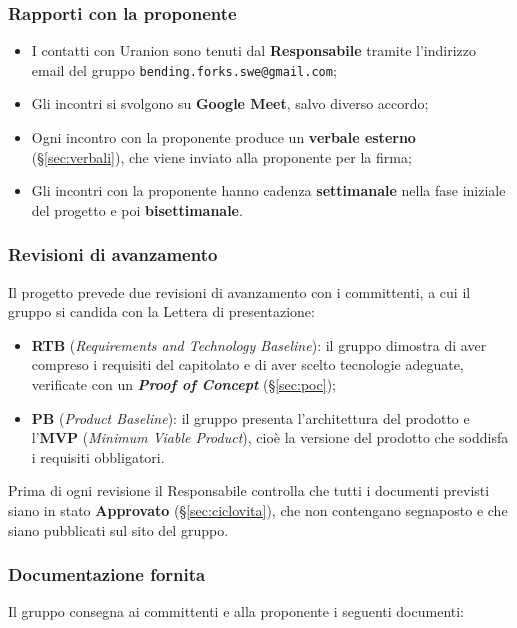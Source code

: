 \documentclass[12pt,a4paper]{article}
\newcommand{\tightlist}{\setlength{\itemsep}{1pt}\setlength{\parskip}{0pt}}
\begin{document}
\subsubsection{Rapporti con la proponente}
\begin{itemize}
\tightlist
\item I contatti con Uranion sono tenuti dal \textbf{Responsabile} tramite l'indirizzo email del gruppo \texttt{bending.forks.swe@gmail.com};
\item Gli incontri si svolgono su \textbf{Google Meet}, salvo diverso accordo;
\item Ogni incontro con la proponente produce un \textbf{verbale esterno} (§\ref{sec:verbali}), che viene inviato alla proponente per la firma;
\item Gli incontri con la proponente hanno cadenza \textbf{settimanale} nella fase iniziale del progetto e poi \textbf{bisettimanale}.
\end{itemize}

\subsubsection{Revisioni di avanzamento}\label{sec:revisioni}
Il progetto prevede due revisioni di avanzamento con i committenti, a cui il gruppo si candida con la Lettera di presentazione:
\begin{itemize}
\tightlist
\item \textbf{RTB} (\emph{Requirements and Technology Baseline}): il gruppo dimostra di aver compreso i requisiti del capitolato e di aver scelto tecnologie adeguate, verificate con un \textbf{\emph{Proof of Concept}} (§\ref{sec:poc});
\item \textbf{PB} (\emph{Product Baseline}): il gruppo presenta l'architettura del prodotto e l'\textbf{MVP} (\emph{Minimum Viable Product}), cioè la versione del prodotto che soddisfa i requisiti obbligatori.
\end{itemize}
Prima di ogni revisione il Responsabile controlla che tutti i documenti previsti siano in stato \textbf{Approvato} (§\ref{sec:ciclovita}), che non contengano segnaposto e che siano pubblicati sul sito del gruppo.

\subsubsection{Documentazione fornita}
Il gruppo consegna ai committenti e alla proponente i seguenti documenti:
\end{document}
